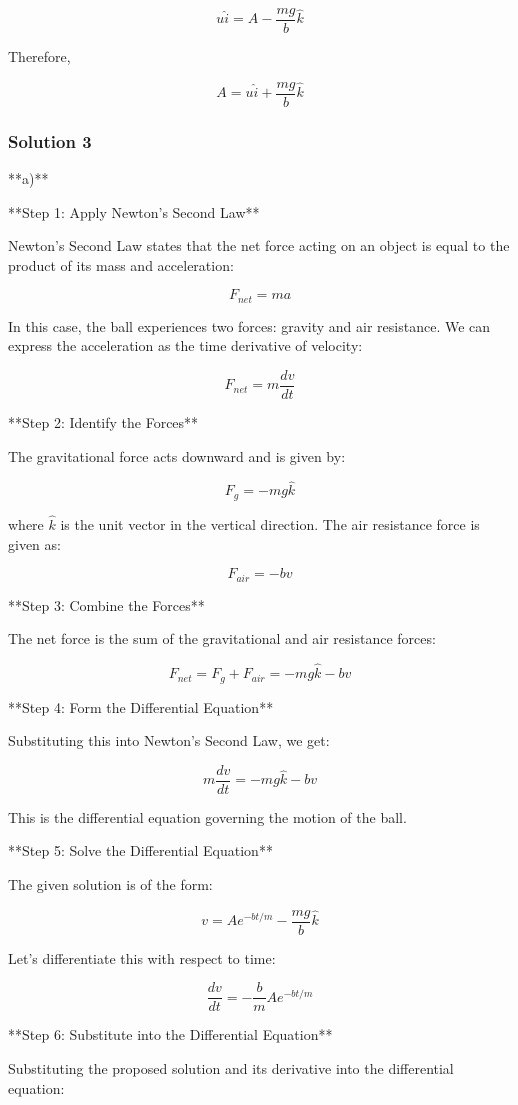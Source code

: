 \documentclass{article}
\begin{document}
$$u\hat{i} = A - \frac{mg}{b}\hat{k}$$

Therefore,

$$A = u\hat{i} + \frac{mg}{b}\hat{k}$$


\subsubsection{Solution 3}
**a)**

**Step 1: Apply Newton's Second Law**

Newton's Second Law states that the net force acting on an object is equal to the product of its mass and acceleration:

$$F_{net} = ma$$

In this case, the ball experiences two forces: gravity and air resistance. We can express the acceleration as the time derivative of velocity:

$$F_{net} = m\frac{dv}{dt}$$

**Step 2: Identify the Forces**

The gravitational force acts downward and is given by:

$$F_g = -mg\hat{k}$$

where $\hat{k}$ is the unit vector in the vertical direction. The air resistance force is given as:

$$F_{air} = -bv$$

**Step 3: Combine the Forces**

The net force is the sum of the gravitational and air resistance forces:

$$F_{net} = F_g + F_{air} = -mg\hat{k} - bv$$

**Step 4: Form the Differential Equation**

Substituting this into Newton's Second Law, we get:

$$m\frac{dv}{dt} = -mg\hat{k} - bv$$

This is the differential equation governing the motion of the ball.

**Step 5: Solve the Differential Equation**

The given solution is of the form:

$$v = Ae^{-bt/m} - \frac{mg}{b}\hat{k}$$

Let's differentiate this with respect to time:

$$\frac{dv}{dt} = -\frac{b}{m}Ae^{-bt/m}$$

**Step 6: Substitute into the Differential Equation**

Substituting the proposed solution and its derivative into the differential equation:
\end{document}
